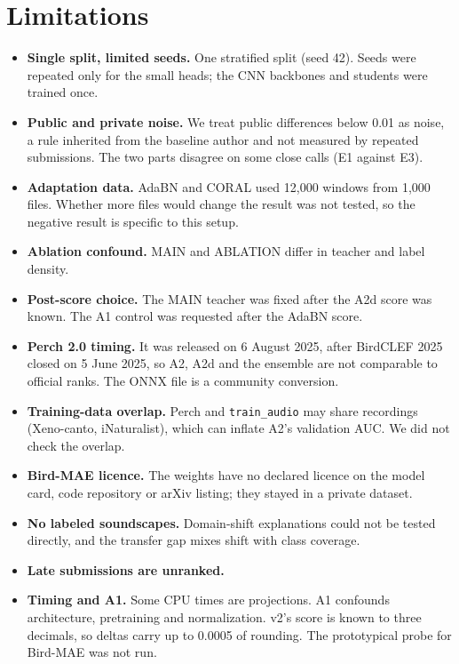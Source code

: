 \documentclass[letterpaper]{article} %
\begin{document}
\section{Limitations}
\begin{itemize}
\item \textbf{Single split, limited seeds.} One stratified split (seed 42). Seeds were repeated only for the small heads; the CNN backbones and students were trained once.
\item \textbf{Public and private noise.} We treat public differences below 0.01 as noise, a rule inherited from the baseline author and not measured by repeated submissions. The two parts disagree on some close calls (E1 against E3).
\item \textbf{Adaptation data.} AdaBN and CORAL used 12,000 windows from 1,000 files. Whether more files would change the result was not tested, so the negative result is specific to this setup.
\item \textbf{Ablation confound.} MAIN and ABLATION differ in teacher and label density.
\item \textbf{Post-score choice.} The MAIN teacher was fixed after the A2d score was known. The A1 control was requested after the AdaBN score.
\item \textbf{Perch 2.0 timing.} It was released on 6 August 2025, after BirdCLEF 2025 closed on 5 June 2025, so A2, A2d and the ensemble are not comparable to official ranks. The ONNX file is a community conversion.
\item \textbf{Training-data overlap.} Perch and \texttt{train\_audio} may share recordings (Xeno-canto, iNaturalist), which can inflate A2's validation AUC. We did not check the overlap.
\item \textbf{Bird-MAE licence.} The weights have no declared licence on the model card, code repository or arXiv listing; they stayed in a private dataset.
\item \textbf{No labeled soundscapes.} Domain-shift explanations could not be tested directly, and the transfer gap mixes shift with class coverage.
\item \textbf{Late submissions are unranked.}
\item \textbf{Timing and A1.} Some CPU times are projections. A1 confounds architecture, pretraining and normalization. v2's score is known to three decimals, so deltas carry up to 0.0005 of rounding. The prototypical probe for Bird-MAE was not run.
\end{itemize}
\end{document}

